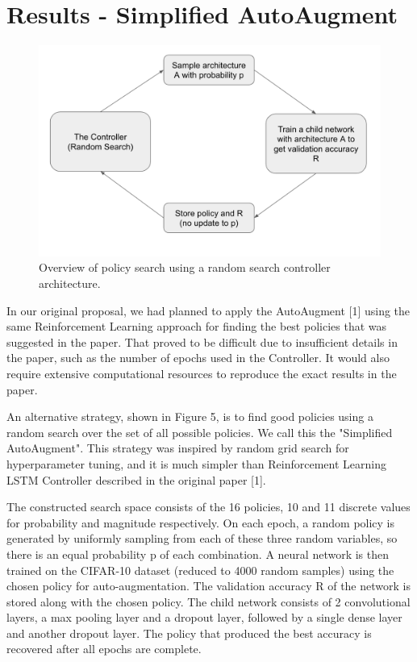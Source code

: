 \documentclass[10pt,twocolumn,letterpaper]{article}
\begin{document}

\section{Results - Simplified AutoAugment}

\begin{figure}[bhp]
\includegraphics[width=\columnwidth]{random_search_arch.png}
\caption{Overview of policy search using a random search controller architecture.}
\end{figure}

In our original proposal, we had planned to apply the AutoAugment [1] using the same Reinforcement Learning approach for finding the best policies that was suggested in the paper.  That proved to be difficult due to insufficient details in the paper, such as the number of epochs used in the Controller.  It would also require extensive computational resources to reproduce the exact results in the paper.

An alternative strategy, shown in Figure 5, is to find good policies using a random search over the set of all possible policies. We call this the "Simplified AutoAugment".  This strategy was inspired by random grid search for hyperparameter tuning, and it is much simpler than Reinforcement Learning LSTM Controller described in the original paper [1]. 

The constructed search space consists of the 16 policies, 10 and 11 discrete values for probability and magnitude respectively.  On each epoch, a random policy is generated by uniformly sampling from each of these three random variables, so there is an equal probability p of each combination. A neural network is then trained on the CIFAR-10 dataset (reduced to 4000 random samples) using the chosen policy for auto-augmentation. The validation accuracy R of the network is stored along with the chosen policy. The child network consists of 2 convolutional layers, a max pooling layer and a dropout layer, followed by a single dense layer and another dropout layer. The policy that produced the best accuracy is recovered after all epochs are complete.
\end{document}
